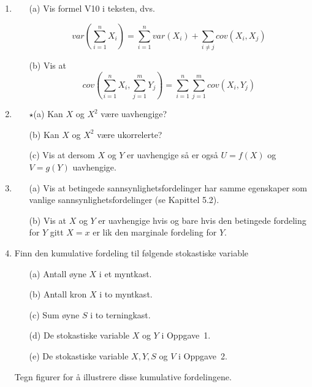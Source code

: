 \begin{enumerate}
\item 
     \begin{itemize}
      \item[(a)]  Vis formel V10 i teksten, dvs.

         \[  var(\sum_{i=1}^n X_i)= \sum_{i=1}^n var(X_i) +
                                        \sum_{i \ne j}cov(X_i,X_j)   \]
     \item[(b)]  Vis at
         \[  cov(\sum_{i=1}^n X_i,\sum_{j=1}^m Y_j)= 
                     \sum_{i=1}^n \sum_{j=1}^m cov(X_i,Y_j)   \]
     \end{itemize}
\item 
      \begin{itemize}
      \item[$\star$(a)]  Kan $X$ og $X^2$ være uavhengige?
      \item[(b)]  Kan $X$ og $X^2$ være ukorrelerte?
      \item[(c)]  Vis at dersom $X$ og $Y$ er uavhengige så er også
          $U=f(X)$ og $V=g(Y)$ uavhengige.
     \end{itemize}

\item 
      \begin{itemize}
        \item[(a)]  Vis at betingede sannsynlighetsfordelinger har samme
          egenskaper som vanlige sannsynlighetsfordelinger (se
          Kapittel 5.2).
      \item[(b)]  Vis at $X$ og $Y$ er uavhengige hvis og bare hvis den
          betingede fordeling for $Y$ gitt $X=x$ er lik den
          marginale fordeling for $Y$.
     \end{itemize}

\item Finn den kumulative fordeling til følgende stokastiske
     variable
      \begin{itemize}
     \item[(a)]  Antall øyne $X$ i et myntkast.
     \item[(b)]  Antall kron $X$ i to myntkast.
     \item[(c)]  Sum øyne $S$ i to terningkast.
     \item[(d)]  De stokastiske variable $X$ og $Y$ i Oppgave~1.
     \item[(e)]  De stokastiske variable $X, Y, S$ og $V$ i Oppgave~2.
     \end{itemize}
     Tegn figurer for å illustrere disse kumulative fordelingene.



\end{enumerate}
